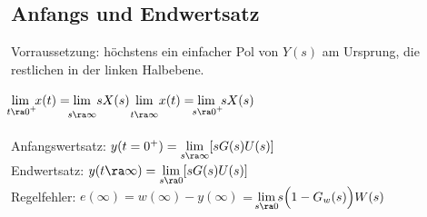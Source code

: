 \documentclass[german]{latex4ei/latex4ei_sheet}
\begin{document}
\begin{sectionbox}
	\subsection{Anfangs und Endwertsatz}
	Vorraussetzung: höchstens ein einfacher Pol von $Y(s)$ am Ursprung, die restlichen in der linken Halbebene.\\

	\begin{emphbox} $\lim\limits_{\mathclap{\phantom{:} t \ra 0^+}} \; x(t) = \lim\limits_{\strut \mathclap{s \ra \infty}} \; s X(s)$ \qquad\qquad $\lim\limits_{\strut \mathclap{t \ra \infty}} \; x(t) = \lim\limits_{\mathclap{\phantom{:} s \ra 0^+}} \; s X(s)$ \end{emphbox}

	Anfangswertsatz: $y(t = 0^+)  = \lim\limits_{s \ra \infty} [s G(s)U(s) ]$\\
	Endwertsatz: $y(t \ra \infty) = \lim\limits_{s \ra 0} [s G(s)U(s) ]$\\
	Regelfehler: $e(\infty) = w(\infty) - y(\infty)$ = $\lim\limits_{\mathclap{s \ra 0}} s \Big(1- G_w(s)\Big) W(s)$
\end{sectionbox}
\end{document}
